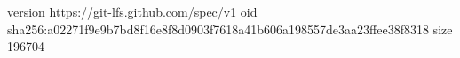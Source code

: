 version https://git-lfs.github.com/spec/v1
oid sha256:a02271f9e9b7bd8f16e8f8d0903f7618a41b606a198557de3aa23ffee38f8318
size 196704
